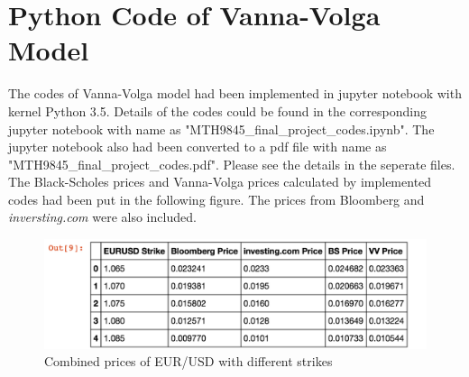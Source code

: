 \section{Python Code of Vanna-Volga Model}
The codes of Vanna-Volga model had been implemented in jupyter notebook with kernel Python 3.5. Details of the codes could be found in the corresponding jupyter notebook with name as "MTH9845\_final\_project\_codes.ipynb". The jupyter notebook also had been converted to a pdf file with name as "MTH9845\_final\_project\_codes.pdf". Please see the details in the seperate files.
\newline
\newline
The Black-Scholes prices and Vanna-Volga prices calculated by implemented codes had been put in the following figure. The prices from Bloomberg and \textit{inversting.com} were also included.
\begin{figure}[tbph]
	\centering
	\includegraphics[width=1.0\linewidth]{./Testing-data/prices-python.png}
	\caption{Combined prices of EUR/USD with different strikes}
	\label{fig:prices-python}
\end{figure}
